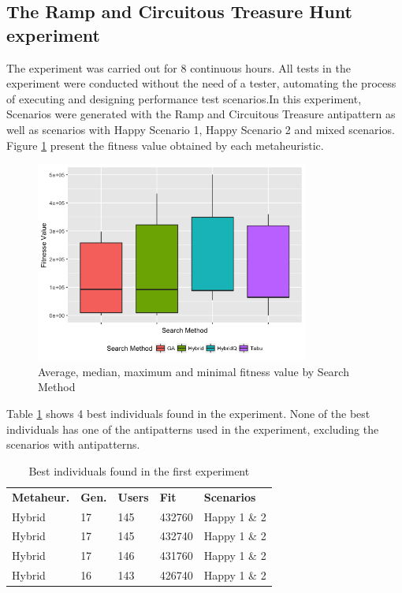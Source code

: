 \documentclass{report}
\begin{document}
\subsection{The Ramp and Circuitous Treasure Hunt experiment}

The experiment was carried out for 8 continuous hours.  All tests in the experiment were conducted without the need of a tester, automating the process of executing and designing performance test scenarios.In this experiment, Scenarios were generated with the Ramp and Circuitous Treasure antipattern as well as scenarios with Happy Scenario 1, Happy Scenario 2 and mixed scenarios. Figure \ref{fig:boxplot1} present the fitness value obtained by each metaheuristic.

\begin{figure}[h]
\centering
\includegraphics[width=0.8\textwidth]{./images/experiment1-4.png}
\caption{Average, median, maximum and minimal fitness value by Search Method}
\label{fig:boxplot1}
\end{figure}

Table \ref{tab:bestindividuals} shows 4 best individuals found in the experiment. None of the best individuals has one of the antipatterns used in the experiment, excluding the scenarios with antipatterns.

\begin{table}[h]
\centering
\caption{Best individuals found in the first experiment}
\label{tab:bestindividuals}
\begin{tabular}{lllll}
\rowcolor[HTML]{C0C0C0}
\textbf{Metaheur.} & \textbf{Gen.} & \textbf{Users} & \textbf{Fit} & \textbf{Scenarios}  \\
Hybrid & 17 & 145 & 432760 & Happy 1 \& 2  \\
Hybrid & 17 & 145 & 432740 & Happy 1 \& 2   \\
Hybrid & 17 & 146 & 431760 & Happy 1 \& 2  \\
Hybrid & 16 & 143 & 426740 & Happy 1 \& 2
\end{tabular}
\end{table}
\end{document}
